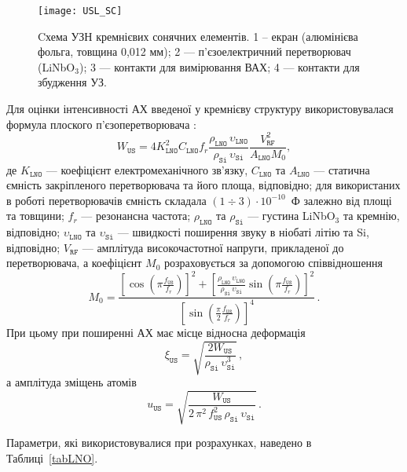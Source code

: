 \begin{figure}
\center
\texttt{[image: USL\_SC]}%
\caption{\label{figUSL:SC}
Cхема УЗН кремнієвих сонячних елементів.
1 --  екран (алюмінієва фольга, товщина 0,012 мм);
2 --- п'єзоелектричний перетворювач (LiNbO$_3$);
3 --- контакти для вимірювання ВАХ;
4 --- контакти для збудження УЗ.
}
\end{figure}


Для оцінки інтенсивності АХ введеної у кремнієву структуру використовувалася формула плоского п’єзоперетворювача \cite{WusBook}:
 \begin{equation}
 \label{eqWus}
 W_\mathtt{US}=4K_\mathtt{LNO}^2C_\mathtt{LNO}f_r\frac{\rho_\mathtt{LNO}\,\upsilon_\mathtt{LNO}}{\rho_\mathtt{Si}\,\upsilon_\mathtt{Si}}\frac{V_\mathtt{RF}^2}{A_\mathtt{LNO}M_0},
 \end{equation}
де
$K_\mathtt{LNO}$ --- коефіцієнт електромеханічного зв'язку,
$C_\mathtt{LNO}$ та $A_\mathtt{LNO}$ --- статична ємність закріпленого перетворювача та його площа, відповідно;
для використаних в роботі перетворювачів ємність складала $(1\div3)\cdot10^{-10}$~Ф залежно від площі та товщини;
$f_r$ --- резонансна частота;
$\rho_\mathtt{LNO}$ та $\rho_\mathtt{Si}$ --- густина LiNbO$_3$ та кремнію, відповідно;
$\upsilon_\mathtt{LNO}$ та $\upsilon_\mathtt{Si}$ --- швидкості поширення звуку в ніобаті літію та Si, відповідно;
$V_\mathtt{RF}$ --- амплітуда високочастотної напруги, прикладеної до перетворювача,
а коефіцієнт $M_0$ розраховується за допомогою співвідношення
 \begin{equation}
 \label{eqM0}
 M_0=\frac{\left[\cos\left(\pi\frac{f_\mathtt{US}}{f_r}\right)\right]^2+\left[\frac{\rho_\mathtt{LNO}\,\upsilon_\mathtt{LNO}}{\rho_\mathtt{Si}\,\upsilon_\mathtt{Si}}\sin\left(\pi\frac{f_\mathtt{US}}{f_r}\right)\right]^2}
 {\left[\sin\left(\frac{\pi}{2}\frac{f_\mathtt{US}}{f_r}\right)\right]^4}\,.
 \end{equation}
При цьому при поширенні АХ має місце відносна деформація
 \begin{equation}
 \label{eqDefUS}
 \xi_{\mathtt{US}}=\sqrt{\frac{2W_\mathtt{US}}{\rho_\mathtt{Si}\,\upsilon_\mathtt{Si}^3}}\,,
 \end{equation}
а амплітуда зміщень атомів
 \begin{equation}
 \label{eqAmpUS}
 u_{\mathtt{US}}=\sqrt{\frac{W_\mathtt{US}}{2\,\pi^2\,f_\mathtt{US}^2\,\rho_\mathtt{Si}\,\upsilon_\mathtt{Si}}}\,.
 \end{equation}

Параметри, які використовувалися при розрахунках, наведено в Таблиці~\ref{tabLNO}.



